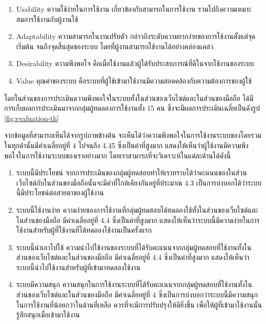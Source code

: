 \begin{enumerate}
    \item Usability ความใช้ง่ายในการใช้งาน เกี่ยวข้องกับสามารถในการใช้งาน รวมไปถึงความเหมาะสมการใช้งานกับผู้งานใช้ 
    \item Adaptability ความสามารถในงานปรับตัว กล่าวถึงระดับความยากง่ายของการใช้งานตั้งแต่จุดเริ่มต้น จนถึงจุดสิ้นสุดของระบบ โดยที่ผู้งานสามารถใช้งานได้อย่างคล่องแคล่ว 
    \item Desirability ความพึงพอใจ คือเมื่อใช้งานแล้วผู้ได้รับประสบการณ์ที่ดีในจากใช้งานของระบบ 
    \item Value คุณค่าของระบบ คือระบบที่ผู้ใช้เข้ามาใช้งานมีความสอดคล้องกับความต้องการของผู้ใช้ 
\end{enumerate}

โดยในส่วนของการประเมินความพึงพอใจในระบบทั้งในส่วนของเว็บไซต์และในส่วนของมือถือ ได้มีการเก็บผลการประเมินมาจากกลุ่มผู้ทดลองการใช้งานทั้ง 15 คน ซึ่งจะมีผลการประเมินเฉลี่ยเป็นดังรูป \ref{fig:evaluation-th}
\fi

\clearpage

\ifenglish
{}
\else
{}

จากข้อมูลที่สามารถเห็นได้จากรูปภาพข้างต้น จะเห็นได้ว่าความพึงพอใจในการใช้งานระบบของโดยรวมในทุกด้านั้นมีค่าเฉลี่ยอยู่ที่ 4 ไปจนถึง 4.45 ซึ่งเป็นค่าที่สูงมาก แสดงให้เห็นว่าผู้ใช้งานมีความพึงพอใจในการใช้งานระบบของเราอย่างมาก โดยเราสามารถที่จะวิเคราะห์ในแต่ละด้านได้ดังนี้

\begin{enumerate}
    \item ระบบนี้มีประโยชน์ จากการประเมินของกลุ่มผู้ทดสอบทำให้เราทราบได้ว่าคะแนนของในส่วนเว็บไซต์กับในส่วนของมือถือนั้นจะมีค่าที่ใกล้เคียงกันอยู่ที่ประมาณ 4.3 เป็นการบ่งบอกได้ว่าระบบนี้มีประโยชน์ต่อสายตาของผู้ใช้งาน
    \item ระบบนี้ใช้งานง่าย ความง่ายของการใช้งานที่กลุ่มผู้ทดสอบได้ทดลองใช้ทั้งในส่วนของเว็บไซต์และในส่วนของมือถือ มีค่าเฉลี่ยอยู่ที่ 4.4 ซึ่งเป็นค่าที่สูงมาก แสดงให้เห็นว่าระบบนี้มีความง่ายในการใช้งานสำหรับผู้ที่ใช้งานที่ได้ทดลองใช้งานเป็นครั้งแรก
    \item ระบบนี้น่าเอาไปใช้ ความน่าไปใช้งานของระบบที่ได้รับคะแนนจากกลุ่มผู้ทดสอบที่ใช้งานทั้งในส่วนของเว็บไซต์และในส่วนของมือถือ มีค่าเฉลี่ยอยู่ที่ 4.4 ซึ่งเป็นค่าที่สูงมาก แสดงให้เห็นว่าระบบนี้น่าไปใช้งานสำหรับผู้ที่เข้ามาทดลองใช้งาน
    \item ระบบมีความสนุก ความสนุกในการใช้งานระบบที่ได้รับคะแนนจากกลุ่มผู้ทดสอบที่ใช้งานทั้งใน\\ ส่วนของเว็บไซต์และในส่วนของมือถือ มีค่าเฉลี่ยอยู่ที่ 4 ซึ่งเป็นการบ่งบอกว่าระบบนี้มีความสนุกในการใช้งานที่น้อยกว่าในด้านที่เหลือ ควรที่จะมีการปรับปรุงให้ดียิ่งขึ้น เพื่อให้ผู้ที่เข้ามาใช้งานนั้นรู้สึกสนุกเมื่อเข้ามาใช้งาน
\end{enumerate}
\fi